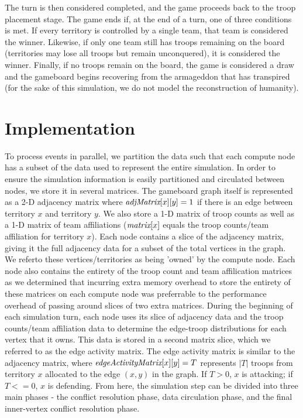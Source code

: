 \documentclass[10pt]{article}
\begin{document}
\begin{multicols}{2}
		The turn is then considered completed, and the game proceeds back to the troop placement stage.
		The game ends if, at the end of a turn, one of three conditions is met. 
		If every territory is controlled by a single team, that team is considered the winner. 
		Likewise, if only one team still has troops remaining on the board (territories may lose all troops but remain unconquered), it is considered the winner.
		Finally, if no troops remain on the board, the game is considered a draw and the gameboard begins recovering from the armageddon that has transpired (for the sake of this simulation, we do not model the reconstruction of humanity).

		\section*{Implementation}

		To process events in parallel, we partition the data such that each compute node has a subset of the data used to represent the entire simulation.
		In order to ensure the simulation information is easily partitioned and circulated between nodes, we store it in several matrices. 
		The gameboard graph itself is represented as a 2-D adjacency matrix where $\emph{adjMatrix}[x][y] = 1$ if there is an edge between territory $x$ and territory $y$. 
		We also store a 1-D matrix of troop counts as well as a 1-D matrix of team affiliations ($\emph{matrix}[x]$ equals the troop counts/team affiliation for territory $x$). 
		Each node contains a slice of the adjacency matrix, giving it the full adjacency data for a subset of the total vertices in the graph.
		We referto these vertices/territories as being 'owned' by the compute node.
		Each node also contains the entirety of the troop count and team affilication matrices as we determined that incurring extra memory overhead to store the entirety of these matrices on each compute node was preferrable to the performance overhead of passing around slices of two extra matrices.
		During the beginning of each simulation turn, each node uses its slice of adjacency data and the troop counts/team affiliation data to determine the edge-troop distributions for each vertex that it owns.
		This data is stored in a second matrix slice, which we referred to as the edge activity matrix. 
		The edge activity matrix is similar to the adjacency matrix, where $\emph{edgeActivityMatrix}[x][y] = T$ represents $|T|$ troops from territory $x$ allocated to the edge $(x, y)$ in the graph. 
		If $T > 0$, $x$ is attacking; if $T <= 0$, $x$ is defending. 
		From here, the simulation step can be divided into three main phases - the conflict resolution phase, data circulation phase, and the final inner-vertex conflict resolution phase. 


\end{multicols}
\end{document}
